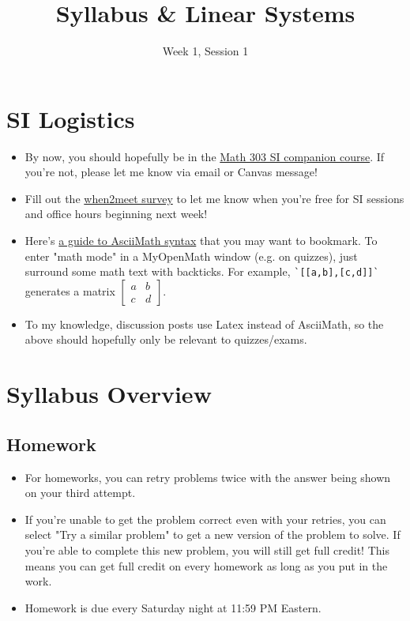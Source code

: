 \documentclass[11pt]{exam}
\title{Syllabus \& Linear Systems}
\date{Week 1, Session 1}
\begin{document}
\maketitle
    
\vspace{10px}
\section{SI Logistics}
    \begin{itemize}
        \item By now, you should hopefully be in the \href{https://iu.instructure.com/courses/2278911}{Math 303 SI companion course}.
        If you're not, please let me know via email or Canvas message!
        \item Fill out the \href{https://www.when2meet.com/?25969358-aRu9i}{when2meet survey} to let me know when you're free for
        SI sessions and office hours beginning next week!
        \item Here's \href{https://asciimath.org/}{a guide to AsciiMath syntax} that you may want to bookmark. To enter "math mode"
        in a MyOpenMath window (e.g. on quizzes), just surround some math text with backticks. For example,
        \verb|`[[a,b],[c,d]]`| generates a matrix $\begin{bmatrix} a & b \\ c & d \end{bmatrix}$.
        \item To my knowledge, discussion posts use Latex instead of AsciiMath, so the above should hopefully only be relevant to quizzes/exams. 
    \end{itemize}
\pagebreak
    
\vspace{10px}
\section{Syllabus Overview}
    \vspace{10px}
    \subsection{Homework}
    \begin{itemize}
        \item For homeworks, you can retry problems twice with the answer being shown on your third attempt.
        \item If you're unable to get the problem correct even with your retries, you can select
        "Try a similar problem" to get a new version of the problem to solve. If you're able to complete this new problem,
        you will still get full credit! This means you can get full credit on every homework as long as you put in the work.
        \item Homework is due every Saturday night at 11:59 PM Eastern.
    \end{itemize}
\end{document}
